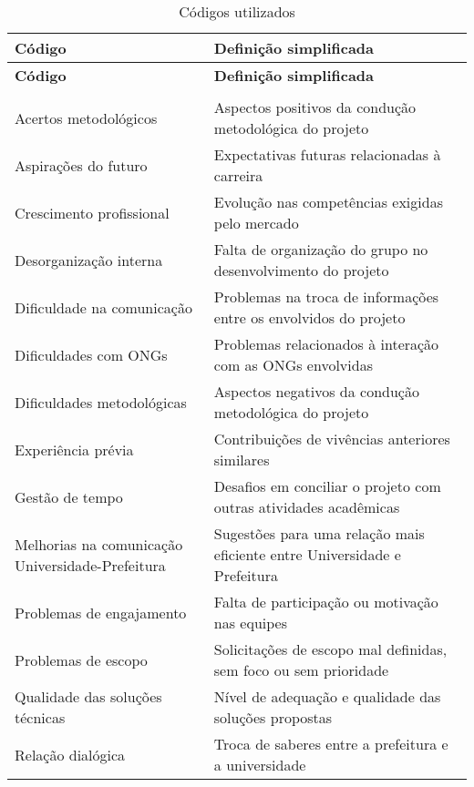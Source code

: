
\begin{longtable}{|>{\raggedright\arraybackslash}p{5cm}|>{\raggedright\arraybackslash}p{10cm}|}
\caption{Códigos utilizados}
\\
\hline
\rowcolor[HTML]{9B9B9B} 
\textbf{Código} & \textbf{Definição simplificada} \\
\hline
\endfirsthead

\hline
\rowcolor[HTML]{9B9B9B} 
\textbf{Código} & \textbf{Definição simplificada} \\
\hline
\endhead

\hline \multicolumn{2}{r}{{Continua na próxima página}} \\
\hline
\endfoot

\hline
\endlastfoot

Acertos metodológicos & Aspectos positivos da condução metodológica do projeto \\ \hline
Aspirações do futuro & Expectativas futuras relacionadas à carreira \\ \hline
Crescimento profissional & Evolução nas competências exigidas pelo mercado \\ \hline
Desorganização interna & Falta de organização do grupo no desenvolvimento do projeto \\ \hline
Dificuldade na comunicação & Problemas na troca de informações entre os envolvidos do projeto \\ \hline
Dificuldades com ONGs & Problemas relacionados à interação com as ONGs envolvidas \\ \hline
Dificuldades metodológicas & Aspectos negativos da condução metodológica do projeto \\ \hline
Experiência prévia & Contribuições de vivências anteriores similares \\ \hline
Gestão de tempo & Desafios em conciliar o projeto com outras atividades acadêmicas \\ \hline
Melhorias na comunicação Universidade-Prefeitura & Sugestões para uma relação mais eficiente entre Universidade e Prefeitura \\ \hline
Problemas de engajamento & Falta de participação ou motivação nas equipes \\ \hline
Problemas de escopo & Solicitações de escopo mal definidas, sem foco ou sem prioridade \\ \hline
Qualidade das soluções técnicas & Nível de adequação e qualidade das soluções propostas \\ \hline
Relação dialógica & Troca de saberes entre a prefeitura e a universidade \\ \hline

\end{longtable}
